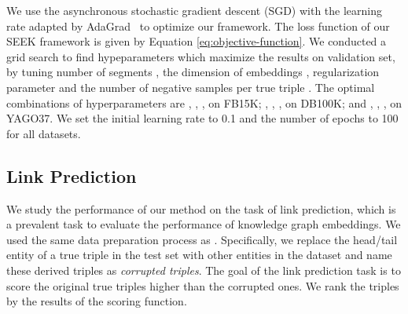 \documentclass[11pt,a4paper]{article}
\begin{document}
We use the asynchronous stochastic gradient descent (SGD) with the learning rate adapted by AdaGrad~\cite{duchi2011adaptive} to optimize our framework. The loss function of our SEEK framework is given by Equation \ref{eq:objective-function}. We conducted a grid search to find hypeparameters which maximize the results on validation set, by tuning number of segments , the dimension of embeddings ,  regularization parameter  and the number of negative samples per true triple . The optimal combinations of hyperparameters are , , ,  on FB15K; , , ,  on DB100K; and , , ,  on YAGO37. We set the initial learning rate  to 0.1 and the number of epochs to 100 for all datasets. 

\subsection{Link Prediction}

We study the performance of our method on the task of link prediction, which is a prevalent task to evaluate the performance of knowledge graph embeddings. We used the same data preparation process as \cite{bordes2013translating}. Specifically, we replace the head/tail entity of a true triple in the test set with other entities in the dataset and name these derived triples as \textit{corrupted triples}. The goal of the link prediction task is to score the original true triples higher than the corrupted ones. We rank the triples by the results of the scoring function.
\end{document}

